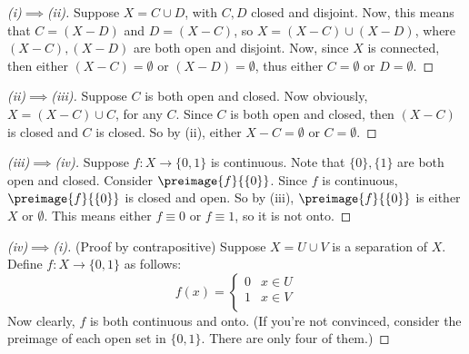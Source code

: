 \documentclass[a5paper]{article}
\theoremstyle{definition}%
\numberwithin{exercise}{section}
\theoremstyle{remark}%
\begin{document}
\begin{proof}[(i)$\implies$(ii)]
Suppose $X=C\cup D$, with $C,D$ closed and disjoint. Now, this means that $C=(X-D)$ and $D=(X-C)$, so $X=(X-C)\cup (X-D)$, where $(X-C),(X-D)$ are both open and disjoint. Now, since $X$ is connected, then either $(X-C)=\emptyset$ or $(X-D)=\emptyset$, thus either $C=\emptyset$ or $D=\emptyset$. 
\end{proof}

\begin{proof}[(ii)$\implies$(iii)]
Suppose $C$ is both open and closed. Now obviously, $X=(X-C)\cup C$, for any $C$. Since $C$ is both open and closed, then $(X-C)$ is closed and $C$ is closed. So by (ii), either $X-C=\emptyset$ or $C=\emptyset$. 
\end{proof}

\begin{proof}[(iii)$\implies$(iv)]
Suppose $f:X\to \{0,1\}$ is continuous. Note that $\{0\},\{1\}$ are both open and closed. Consider $\preimage{f}{\{0\}}$. Since $f$ is continuous,$\preimage{f}{\{0\}}$ is closed and open. So by (iii), $\preimage{f}{\{0\}}$ is either $X$ or $\emptyset$. This means either $f\equiv0$ or $f\equiv1$, so it is not onto. \end{proof}

\begin{proof}[(iv)$\implies$(i)] (Proof by contrapositive)
Suppose $X=U\cup V $ is a separation of $X$. Define $f:X\to \{0,1\}$ as follows:
$$f(x)=
\begin{cases}
0 & x\in U\\
1 & x\in V\\
\end{cases}
$$
Now clearly, $f$ is both continuous and onto. (If you're not convinced, consider the preimage of each open set in $\{0,1\}$. There are only four of them.)
\end{proof}
\end{document}

